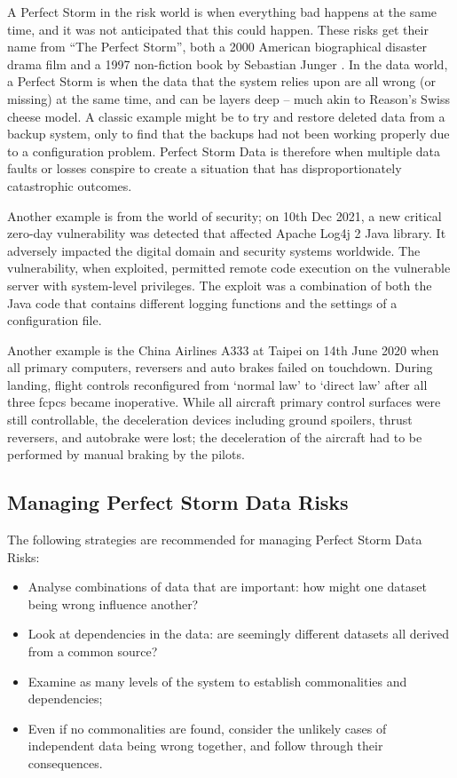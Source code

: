 A Perfect Storm in the risk world is when everything bad happens at the same time,
and it was not anticipated that this could happen.
These risks get their name from “The Perfect Storm”,
both a 2000 American biographical disaster drama film \cite{citation:perfectstorm:website}
and a 1997 non-fiction book by Sebastian Junger \cite{citation:perfectstorm:book}.
In the data world, a Perfect Storm is when the data that the system relies upon are all wrong
(or missing) at the same time, and can be layers deep – much akin to Reason’s Swiss cheese model.
A classic example might be to try and restore deleted data from a backup system,
only to find that the backups had not been working properly due to a configuration problem.
Perfect Storm Data is therefore when multiple data faults or losses conspire to create a
situation that has disproportionately catastrophic outcomes.

Another example is from the world of security;
on 10th Dec 2021, a new critical zero-day vulnerability was detected that affected
Apache Log4j 2 Java library.
It adversely impacted the digital domain and security systems worldwide.
The vulnerability, when exploited, permitted remote code execution on the vulnerable server
with system-level privileges.
The exploit was a combination of both the Java code that contains different logging functions
and the settings of a configuration file.

Another example is the China Airlines A333 at Taipei on 14th June 2020  when all primary computers,
reversers and auto brakes failed on touchdown.
During landing, flight controls reconfigured from ‘normal law’ to ‘direct law’ after all three
\glspl{fcpc} became inoperative.
While all aircraft primary control surfaces were still controllable,
the deceleration devices including ground spoilers, thrust reversers, and autobrake were lost;
the deceleration of the aircraft had to be performed by manual braking by the pilots.

\subsection{Managing Perfect Storm Data Risks}
The following strategies are recommended for managing Perfect Storm Data Risks:
\begin{itemize}
\item Analyse combinations of data that are important: how might one \gls{dataset} being wrong influence another?
\item Look at dependencies in the data: are seemingly different \glspl{dataset} all derived from a common source?
\item Examine as many levels of the system to establish commonalities and dependencies;
\item Even if no commonalities are found,
consider the unlikely cases of independent data being wrong together,
and follow through their consequences.
\end{itemize}

